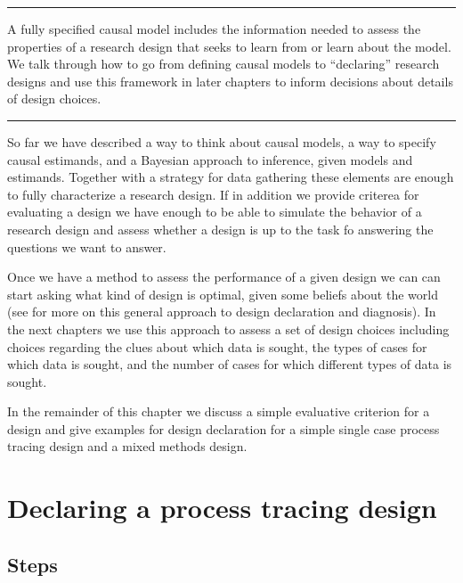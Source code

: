 \documentclass[12pt,]{book}
\begin{document}
\begin{center}\rule{0.5\linewidth}{\linethickness}\end{center}

A fully specified causal model includes the information needed to assess the properties of a research design that seeks to learn from or learn about the model. We talk through how to go from defining causal models to ``declaring'' research designs and use this framework in later chapters to inform decisions about details of design choices.

\begin{center}\rule{0.5\linewidth}{\linethickness}\end{center}

So far we have described a way to think about causal models, a way to specify causal estimands, and a Bayesian approach to inference, given models and estimands. Together with a strategy for data gathering these elements are enough to fully characterize a research design. If in addition we provide criterea for evaluating a design we have enough to be able to simulate the behavior of a research design and assess whether a design is up to the task fo answering the questions we want to answer.

Once we have a method to assess the performance of a given design we can can start asking what kind of design is optimal, given some beliefs about the world (see \citet{blair2016declaring} for more on this general approach to design declaration and diagnosis). In the next chapters we use this approach to assess a set of design choices including choices regarding the clues about which data is sought, the types of cases for which data is sought, and the number of cases for which different types of data is sought.

In the remainder of this chapter we discuss a simple evaluative criterion for a design and give examples for design declaration for a simple single case process tracing design and a mixed methods design.

\hypertarget{declaring-a-process-tracing-design}{%
\section{Declaring a process tracing design}\label{declaring-a-process-tracing-design}}

\hypertarget{steps}{%
\subsection{Steps}\label{steps}}
\end{document}
